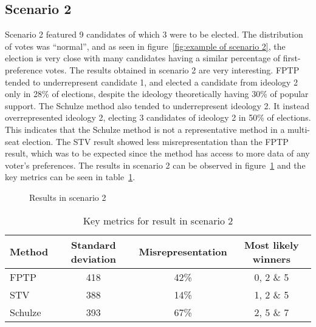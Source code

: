 \documentclass[12pt]{article}
\begin{document}
\subsection{Scenario 2}
Scenario 2 featured 9 candidates of which 3 were to be elected. The distribution of votes was ``normal'', and as seen in figure~\ref{fig:example of scenario 2}, the election is very close with many candidates having a similar percentage of first-preference votes. The results obtained in scenario 2 are very interesting. FPTP tended to underrepresent candidate 1, and elected a candidate from ideology 2 only in 28\% of elections, despite the ideology theoretically having 30\% of popular support. The Schulze method also tended to underrepresent ideology 2. It instead overrepresented ideology 2, electing 3 candidates of ideology 2 in 50\% of elections. This indicates that the Schulze method is not a representative method in a multi-seat election. The STV result showed less misrepresentation than the FPTP result, which was to be expected since the method has access to more data of any voter's preferences. The results in scenario 2 can be observed in figure~\ref{fig:scenario 2 result} and the key metrics can be seen in table~\ref{tab:scenario 2 result}.
\begin{figure}
	\centering
	\caption{Results in scenario 2}
\label{fig:scenario 2 result}
\end{figure}

\begin{table}
\centering
\caption{Key metrics for result in scenario 2}
\label{tab:scenario 2 result}
\begin{tabular}{@{}lccc@{}}
\toprule
Method & Standard deviation & Misrepresentation & Most likely winners \\ \midrule
FPTP & 418 & 42\% & 0, 2 \& 5 \\
STV & 388 & 14\% & 1, 2 \& 5 \\
Schulze & 393 & 67\% & 2, 5 \& 7  \\ \bottomrule
\end{tabular}
\end{table}
\end{document}
